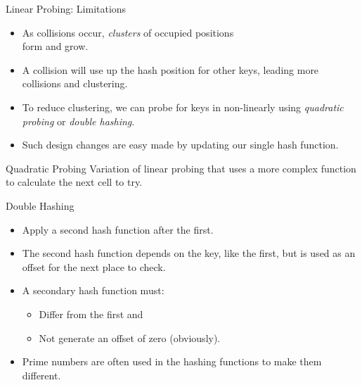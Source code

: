 \documentclass[14pt,aspectratio=1610]{beamer}
\begin{document}
\begin{frame}{Linear Probing: Limitations}
  \begin{itemize}[<+->]
    \item 
      As collisions occur, \emph{clusters} of occupied positions\\ form and grow.

    \item
      A collision will use up the hash position for other keys, leading more collisions and clustering.

    \item
      To reduce clustering, we can probe for keys in non-linearly using \emph{quadratic probing} or \emph{double hashing}.

    \item
      Such design changes are easy made by updating our single hash function.
  \end{itemize}
\end{frame}

\begin{frame}{Quadratic Probing}
Variation of linear probing that uses a more complex function to calculate the next cell to try.
\end{frame}

\begin{frame}[fragile]{Double Hashing}
\begin{itemize}
  \item
    Apply a second hash function after the first.
  \item
    The second hash function depends on the key, like the first, but is used as an offset for the next place to check.
  \item
    A secondary hash function must:
    \begin{itemize}
    \item
      Differ from the first and
    \item
      Not generate an offset of zero (obviously).
    \end{itemize}
  \item
    Prime numbers are often used in the hashing functions to make them different.
\end{itemize}
\end{frame}
\end{document}

